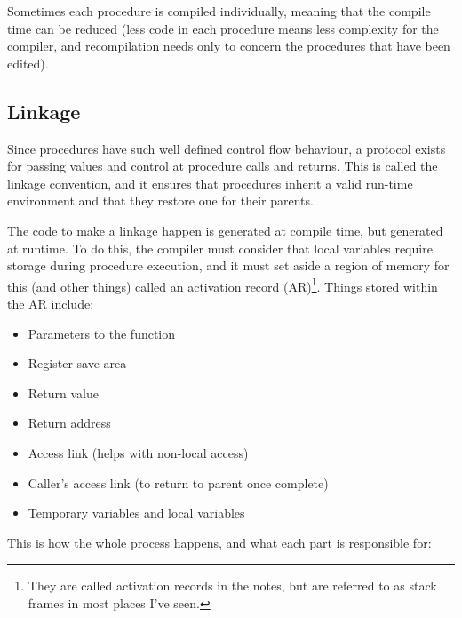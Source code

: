 Sometimes each procedure is compiled individually, meaning that the
compile time can be reduced (less code in each procedure means less
complexity for the compiler, and recompilation needs only to concern
the procedures that have been edited).

\subsection{Linkage}

Since procedures have such well defined control flow behaviour, a
protocol exists for passing values and control at procedure calls and
returns. This is called the linkage convention, and it ensures that
procedures inherit a valid run-time environment and that they restore
one for their parents.

The code to make a linkage happen is generated at compile time, but
generated at runtime. To do this, the compiler must consider that
local variables require storage during procedure execution, and it
must set aside a region of memory for this (and other things) called
an activation record (AR)\footnote{They are called activation records
in the notes, but are referred to as stack frames in most places I've
seen.}. Things stored within the AR include:

\begin{itemize}
\item Parameters to the function
\item Register save area
\item Return value
\item Return address
\item Access link (helps with non-local access)
\item Caller's access link (to return to parent once complete)
\item Temporary variables and local variables
\end{itemize}

This is how the whole process happens, and what each part is responsible for:

